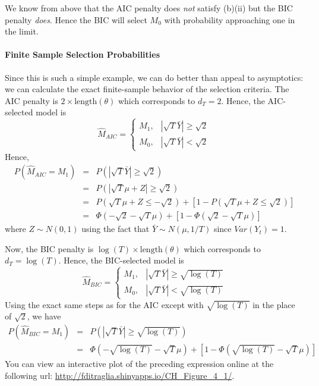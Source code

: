 We know from above that the AIC penalty does \emph{not} satisfy (b)(ii) but the BIC penalty \emph{does}. Hence the BIC will select $M_0$ with probability approaching one in the limit.

\paragraph{Finite Sample Selection Probabilities} Since this is such a simple example, we can do better than appeal to asymptotics: we can calculate the exact finite-sample behavior of the selection criteria. The AIC penalty is $2 \times \mbox{length}(\theta)$ which corresponds to $d_T = 2$. Hence, the AIC-selected model is
	$$\widehat{M}_{AIC} = \left\{\begin{array}
		{cc} M_1, &|\sqrt{T}\bar{Y}| \geq \sqrt{2} \\
		M_0, & |\sqrt{T} \bar{Y}| < \sqrt{2}
	\end{array} \right.$$
Hence,
	\begin{eqnarray*}
		P\left(\widehat{M}_{AIC} = M_1\right) &=& P\left(\left|\sqrt{T}\bar{Y} \right| \geq \sqrt{2}  \right)\\
		&=& P\left(\left|\sqrt{T}\mu + Z\right| \geq \sqrt{2}  \right)\\
		&=& P\left(\sqrt{T}\mu + Z \leq -\sqrt{2}\right) + \left[1 - P\left(\sqrt{T} \mu +Z \leq \sqrt{2}\right) \right]\\
			&=& \Phi\left(-\sqrt{2} - \sqrt{T}\mu\right) + \left[1 -  \Phi\left(\sqrt{2} - \sqrt{T} \mu \right)\right]
	\end{eqnarray*}
where $Z \sim N(0,1)$ using the fact that $\bar{Y} \sim N(\mu, 1/T)$ since $Var(Y_t)=1$.

Now, the BIC penalty is $\log(T)\times \mbox{length}(\theta)$ which corresponds to $d_T = \log(T)$. Hence, the BIC-selected model is
	$$\widehat{M}_{BIC} = \left\{\begin{array}
		{cc} M_1, & |\sqrt{T}\bar{Y} | \geq \sqrt{\log(T)} \\
		M_0, & |\sqrt{T} \bar{Y}| < \sqrt{\log(T)}
	\end{array} \right.$$
Using the exact same steps as for the AIC except with $\sqrt{\log(T)}$ in the place of $\sqrt{2}$, we have
	\begin{eqnarray*}
		P\left(\widehat{M}_{BIC} = M_1\right) &=& P\left(\left|\sqrt{T}\bar{Y} \right| \geq \sqrt{\log(T)}  \right)\\
			&=& \Phi\left(-\sqrt{\log(T)} - \sqrt{T}\mu\right) + \left[1 -  \Phi\left(\sqrt{\log(T)} - \sqrt{T} \mu \right)\right]
	\end{eqnarray*}
You can view an interactive plot of the preceding expression online at the following url:
\url{http://fditraglia.shinyapps.io/CH_Figure_4_1/}.

